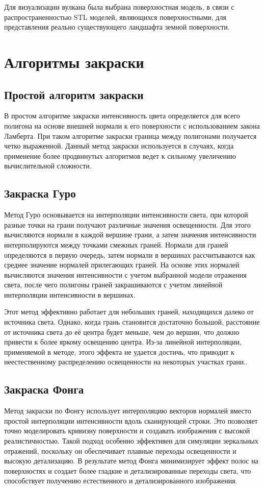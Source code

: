 Для визуализации вулкана была выбрана поверхностная модель, в связи с распространенностью STL моделей, являющихся поверхностными, для представления реально существующего ландшафта земной поверхности.

\section{Алгоритмы закраски}

\subsection{Простой алгоритм закраски}

В простом алгоритме закраски интенсивность цвета определяется для всего полигона на основе внешней нормали к его поверхности с использованием закона Ламберта. При таком алгоритме закраски граница между полигонами получается четко выраженной. Данный метод закраски используется в случаях, когда применение более продвинутых алгоритмов ведет к сильному увеличению вычислительной сложности.

\subsection{Закраска Гуро}
Метод Гуро основывается на интерполяции интенсивности света, при которой разные точки на грани получают различные значения освещенности. Для этого вычисляются нормали в каждой вершине грани, а затем значения интенсивности интерполируются между точками смежных граней. Нормали для граней определяются в первую очередь, затем нормали в вершинах рассчитываются как среднее значение нормалей прилегающих граней. На основе этих нормалей вычисляются значения интенсивности с учетом выбранной модели отражения света, после чего полигоны граней закрашиваются с учетом линейной интерполяции интенсивности в вершинах.

Этот метод эффективно работает для небольших граней, находящихся далеко от источника света. Однако, когда грань становится достаточно большой, расстояние от источника света до её центра будет меньше, чем до вершин, что должно привести к более яркому освещению центра. Из-за линейной интерполяции, применяемой в методе, этого эффекта не удается достичь, что приводит к неестественному распределению освещенности на некоторых участках грани.\cite{lit2}.

\subsection{Закраска Фонга}
Метод закраски по Фонгу использует интерполяцию векторов нормалей вместо простой интерполяции интенсивности вдоль сканирующей строки. Это позволяет точно моделировать кривизну поверхности и создавать изображения с высокой реалистичностью. Такой подход особенно эффективен для симуляции зеркальных отражений, поскольку он обеспечивает плавные переходы освещенности и высокую детализацию. В результате метод Фонга минимизирует эффект полос на поверхностях и создает более гладкие и детализированные переходы света, что способствует получению естественного и детализированного изображения.

